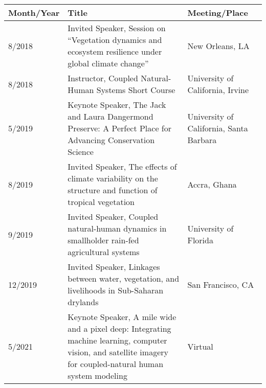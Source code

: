 
\begin{longtable}{lp{10.0cm}p{4.5cm}}
Month/Year & Title & Meeting/Place\\
\hline 
\endhead 
8/2018 & Invited Speaker, Session on ``Vegetation dynamics and ecosystem resilience under global climate change'' & New Orleans, LA \\
8/2018 & Instructor, Coupled Natural-Human Systems Short Course & University of California, Irvine \\
5/2019 & Keynote Speaker, The Jack and Laura Dangermond Preserve: A Perfect Place for Advancing Conservation Science & University of California, Santa Barbara \\
8/2019 & Invited Speaker, The effects of climate variability on the structure and function of tropical vegetation & Accra, Ghana \\
9/2019 & Invited Speaker, Coupled natural-human dynamics in smallholder rain-fed agricultural systems & University of Florida \\
12/2019 & Invited Speaker, Linkages between water, vegetation, and livelihoods in Sub-Saharan drylands & San Francisco, CA \\
5/2021 & Keynote Speaker, A mile wide and a pixel deep: Integrating machine learning, computer vision, and satellite imagery for coupled-natural human system modeling & Virtual \\
\end{longtable}

